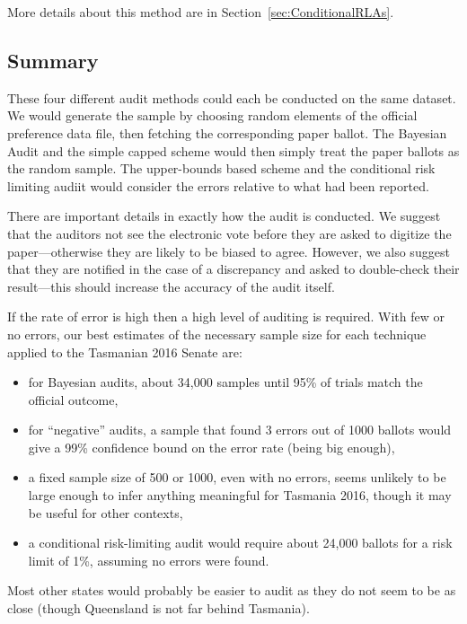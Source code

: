 \documentclass[10pt,a4paper]{article}
\newcommand{\shortVersion}[1]{}
\newcommand{\longVersion}[1]{#1}
\newcommand{\shortVersion}[1]{#1}
\newcommand{\longVersion}[1]{}
\begin{document}
\shortVersion{}\longVersion{More details about this method are in Section~\ref{sec:ConditionalRLAs}.}

\subsection{Summary}
These four different audit methods could each be conducted on the same dataset.  We would generate the sample by choosing random elements of the official preference data file, then fetching the corresponding paper ballot.  The Bayesian Audit and the simple capped scheme would then simply treat the paper ballots as the random sample.  The upper-bounds based scheme and the conditional risk limiting audiit would consider the errors relative to what had been reported.

There are important details in exactly how the audit is conducted.  We suggest that the auditors not see the electronic vote before they are asked to digitize the paper---otherwise they are likely to be biased to agree.  However, we also suggest that they are notified in the case of a discrepancy and asked to double-check their result---this should increase the accuracy of the audit itself.

If the rate of error is high then a high level of auditing is required.  With few or no errors, our best estimates of the necessary sample size for each technique applied to the Tasmanian 2016 Senate are:
\begin{itemize}
	\item for Bayesian audits, about 34,000 samples until 95\% of trials match the official outcome,
	\item for ``negative'' audits, a sample that found 3 errors out of 1000 ballots would give a 99\% confidence bound on the error rate (being big enough),
	\item a fixed sample size of 500 or 1000, even with no errors, seems unlikely to be large enough to infer anything meaningful for Tasmania 2016, though it may be useful for other contexts,
	\item a conditional risk-limiting audit  would require about 24,000 ballots for a risk limit of 1\%, assuming no errors were found.
\end{itemize}

Most other states would probably be easier to audit as they do not seem to be as close (though Queensland is not far behind Tasmania).
\end{document}
